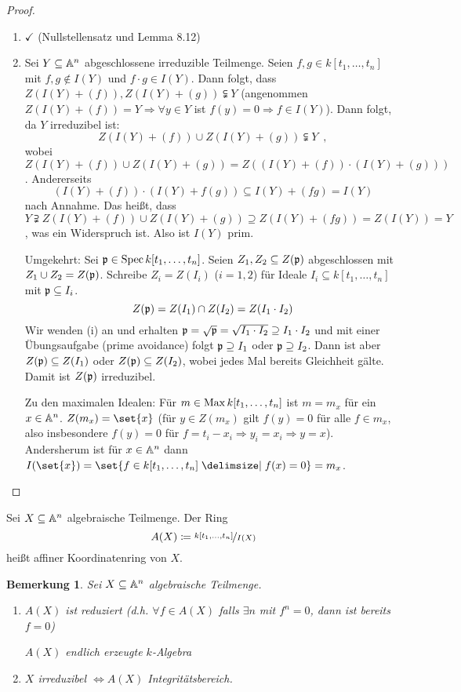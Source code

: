\documentclass[12pt,a4paper]{scrartcl}
\theoremstyle{cplain}
\theoremstyle{cdef}
\newtheorem{beme}[thmcounter]{Bemerkung}
\begin{document}
\begin{proof}
	\leavevmode
	\begin{enumerate}
		\item $\checkmark$ (Nullstellensatz und Lemma 8.12)
		\item Sei $Y\subseteq \mathbb A^n$ abgeschlossene irreduzible Teilmenge. Seien $f,g\in k[t_1,\dots, t_n]$ mit $f,g\notin I(Y)$ und $f\cdot g \in I(Y)$. Dann folgt, dass $Z(I(Y)+(f)), Z(I(Y)+(g))\subsetneqq Y$ (angenommen $Z(I(Y)+(f)) = Y\Rightarrow \forall y\in Y$ ist $f(y) = 0\Rightarrow f\in I(Y)$). Dann folgt, da $Y$ irreduzibel ist:
		$$Z(I(Y)+(f)) \cup Z(I(Y)+(g)) \subsetneqq Y\enspace ,$$
		wobei $Z(I(Y)+(f))\cup Z(I(Y)+(g)) = Z((I(Y)+(f))\cdot (I(Y)+(g)))$. Andererseits
		$$(I(Y)+(f))\cdot (I(Y)+f(g))\subseteq I(Y)+(fg)= I(Y)$$
		nach Annahme. Das heißt, dass $Y\supsetneqq Z(I(Y)+(f))\cup Z(I(Y)+(g))\supseteq Z(I(Y)+(fg)) = Z(I(Y)) = Y$, was ein Widerspruch ist. Also ist $I(Y)$ prim.
		
		Umgekehrt: Sei $\mathfrak{p} \in \operatorname{Spec} k[t_1,\dots, t_n]$. Seien $Z_1,Z_2\subseteq Z(\mathfrak{p})$ abgeschlossen mit $Z_1\cup Z_2 = Z(\mathfrak{p})$. Schreibe $Z_i = Z(I_i)$ ($i= 1,2$) für Ideale $I_i\subseteq k[t_1,\dots, t_n]$ mit $\mathfrak{p}\subseteq I_i$.
		$$Z(\mathfrak{p}) = Z(I_1)\cap Z(I_2) = Z(I_1\cdot I_2)$$
		Wir wenden (i) an und erhalten $ \mathfrak{p} = \sqrt{\mathfrak{p}} = \sqrt{I_1\cdot I_2}\supseteq I_1\cdot I_2$ und mit einer Übungsaufgabe (prime avoidance) folgt $\mathfrak{p} \supseteq I_1$ oder $\mathfrak{p}\supseteq I_2$. Dann ist aber $Z(\mathfrak{p}) \subseteq Z(I_1)$ oder $Z(\mathfrak{p})\subseteq Z(I_2)$, wobei jedes Mal bereits Gleichheit gälte. Damit ist $Z(\mathfrak{p})$ irreduzibel.
		
		Zu den maximalen Idealen: Für $m\in\operatorname{Max} k[t_1,\dots, t_n]$ ist $m = m_x$ für ein $x\in\mathbb A^n$. $Z(m_x) = \set{x}$ (für $y\in Z(m_x)$ gilt $f(y) = 0$ für alle $f\in m_x$, also insbesondere $f(y) = 0$ für $f = t_i-x_i\Rightarrow y_i = x_i\Rightarrow y = x$). Andersherum ist für $x\in\mathbb A^n$ dann $I(\set{x}) = \set{f\in k[t_1,\dots, t_n]\given f(x) = 0} = m_x$.
	\end{enumerate}	
\end{proof}

\begin{defi}
	Sei $X\subseteq \mathbb A^n$ algebraische Teilmenge. Der Ring
	$$A(X)\coloneqq \nicefrac{k[t_1,\dots, t_n]}{I(X)}$$
	heißt affiner Koordinatenring von $X$.
	
\end{defi}
\begin{beme}
	Sei $X\subseteq \mathbb A^n$ algebraische Teilmenge.
	\begin{enumerate}
		\item $A(X)$ ist reduziert (d.h. $\forall f\in A(X)$ falls $\exists n$ mit $f^n = 0$, dann ist bereits $f = 0$)
		
		$A(X)$ endlich erzeugte $k$-Algebra
		\item $X$ irreduzibel $\Leftrightarrow A(X)$ Integritätsbereich.
	\end{enumerate}
\end{beme}
\end{document}
